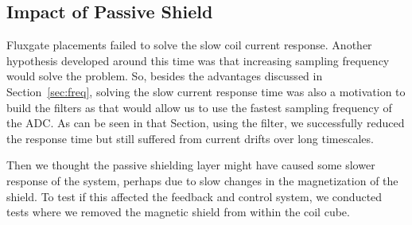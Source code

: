 



\subsection{Impact of Passive Shield}\label{sec:shield_impact}

Fluxgate placements failed to solve the slow coil current response.
Another hypothesis developed around this time was that increasing
sampling frequency would solve the problem.  So, besides the advantages
discussed in Section~\ref{sec:freq}, solving the slow current response
time was also a motivation to build the filters as that would allow us
to use the fastest sampling frequency of the ADC.  As can be seen in
that Section, using the filter, we successfully reduced the response
time but still suffered from current drifts over long timescales.

Then we thought the passive shielding layer might have caused some
slower response of the system, perhaps due to slow changes in the
magnetization of the shield. To test if this affected the feedback and
control system, we conducted tests where we removed the magnetic shield
from within the coil cube.



